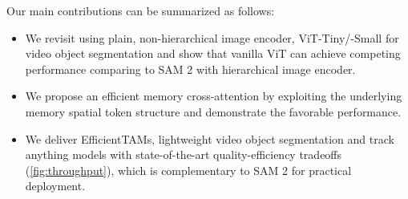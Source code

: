 Our main contributions can be summarized as follows:
\begin{itemize}[noitemsep,topsep=0pt,leftmargin=0.5cm]
    \item 
    We revisit using plain, non-hierarchical image encoder, ViT-Tiny/-Small for video object segmentation and show that vanilla ViT can achieve competing performance comparing to SAM 2 with hierarchical image encoder. 
    
    
    \item We propose an efficient memory cross-attention by exploiting the underlying memory spatial token structure and demonstrate the favorable performance. 
    
    
    \item We deliver EfficientTAMs, lightweight video object segmentation and track anything models with state-of-the-art quality-efficiency tradeoffs (\cref{fig:throughput}), which is complementary to SAM 2 for practical deployment. 
    
\end{itemize}

